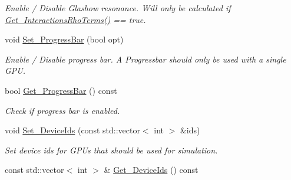 \begin{DoxyCompactItemize}
\begin{DoxyCompactList}\small\item\em Enable / Disable Glashow resonance. Will only be calculated if \hyperlink{structcudanusquids_1_1ParameterObject_a71effd76b49ee99e45370d28c05f73ad}{Get\+\_\+\+Interactions\+Rho\+Terms()} == true. \end{DoxyCompactList}\item 
void \hyperlink{structcudanusquids_1_1ParameterObject_a7f64d65de4ab8fa1ab8bc0a8d73ad4dd}{Set\+\_\+\+Progress\+Bar} (bool opt)\hypertarget{structcudanusquids_1_1ParameterObject_a7f64d65de4ab8fa1ab8bc0a8d73ad4dd}{}\label{structcudanusquids_1_1ParameterObject_a7f64d65de4ab8fa1ab8bc0a8d73ad4dd}

\begin{DoxyCompactList}\small\item\em Enable / Disable progress bar. A Progressbar should only be used with a single G\+PU. \end{DoxyCompactList}\item 
bool \hyperlink{structcudanusquids_1_1ParameterObject_a0bac24dbab92518b4a3a98f2987512de}{Get\+\_\+\+Progress\+Bar} () const \hypertarget{structcudanusquids_1_1ParameterObject_a0bac24dbab92518b4a3a98f2987512de}{}\label{structcudanusquids_1_1ParameterObject_a0bac24dbab92518b4a3a98f2987512de}

\begin{DoxyCompactList}\small\item\em Check if progress bar is enabled. \end{DoxyCompactList}\item 
void \hyperlink{structcudanusquids_1_1ParameterObject_a3391eb5997986b94c5c3888b2f70544c}{Set\+\_\+\+Device\+Ids} (const std\+::vector$<$ int $>$ \&ids)\hypertarget{structcudanusquids_1_1ParameterObject_a3391eb5997986b94c5c3888b2f70544c}{}\label{structcudanusquids_1_1ParameterObject_a3391eb5997986b94c5c3888b2f70544c}

\begin{DoxyCompactList}\small\item\em Set device ids for G\+P\+Us that should be used for simulation. \end{DoxyCompactList}\item 
const std\+::vector$<$ int $>$ \& \hyperlink{structcudanusquids_1_1ParameterObject_af182f2c95ddb6f03d308078a64a18867}{Get\+\_\+\+Device\+Ids} () const \hypertarget{structcudanusquids_1_1ParameterObject_af182f2c95ddb6f03d308078a64a18867}{}\label{structcudanusquids_1_1ParameterObject_af182f2c95ddb6f03d308078a64a18867}


\end{DoxyCompactItemize}
